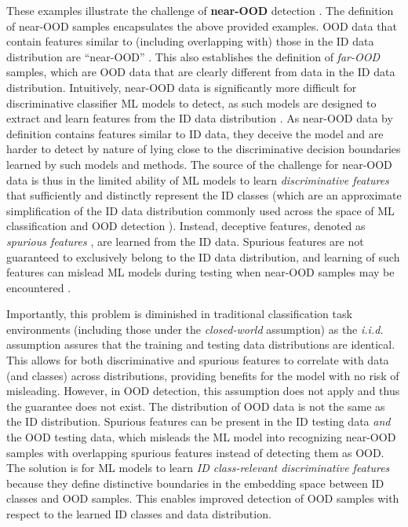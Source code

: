 These examples illustrate the challenge of \textbf{near-OOD} detection \cite{yang2022openood,winkens2020contrastive}. The definition of near-OOD samples encapsulates the above provided examples. OOD data that contain features similar to (including overlapping with) those in the ID data distribution are ``near-OOD'' \cite{winkens2020contrastive}. This also establishes the definition of \textit{far-OOD} samples, which are OOD data that are clearly different from data in the ID data distribution. Intuitively, near-OOD data is significantly more difficult for discriminative classifier ML models to detect, as such models are designed to extract and learn features from the ID data distribution \cite{rubinstein1997discriminative,liu2012discriminative}. As near-OOD data by definition contains features similar to ID data, they deceive the model and are harder to detect by nature of lying close to the discriminative decision boundaries learned by such models and methods. The source of the challenge for near-OOD data is thus in the limited ability of ML models to learn \textit{discriminative features} that sufficiently and distinctly represent the ID classes (which are an approximate simplification of the ID data distribution commonly used across the space of ML classification and OOD detection \cite{kim2015deep,wang2016machine,hendrycks2017baseline}). Instead, deceptive features, denoted as \textit{spurious features} \cite{neuhaus2023spurious}, are learned from the ID data. Spurious features are not guaranteed to exclusively belong to the ID data distribution, and learning of such features can mislead ML models during testing when near-OOD samples may be encountered \cite{ming2022impact,paullada2021data}.

Importantly, this problem is diminished in traditional classification task environments (including those under the \textit{closed-world} assumption) as the \textit{i.i.d.} assumption assures that the training and testing data distributions are identical. This allows for both discriminative and spurious features to correlate with data (and classes) across distributions, providing benefits for the model with no risk of misleading. However, in OOD detection, this assumption does not apply and thus the guarantee does not exist. The distribution of OOD data is not the same as the ID distribution. Spurious features can be present in the ID testing data \textit{and} the OOD testing data, which misleads the ML model into recognizing near-OOD samples with overlapping spurious features instead of detecting them as OOD. The solution is for ML models to learn \textit{ID class-relevant discriminative features} because they define distinctive boundaries in the embedding space between ID classes and OOD samples. This enables improved detection of OOD samples with respect to the learned ID classes and data distribution.

